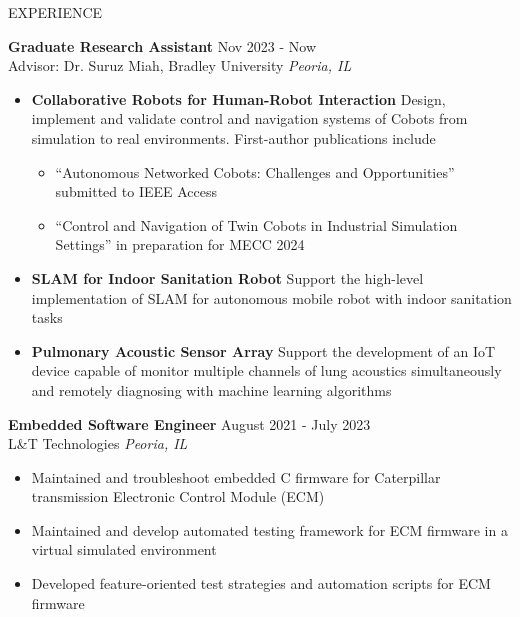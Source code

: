 \documentclass{lib/resume} %
\begin{document}
\begin{rSection}{EXPERIENCE}

    \textbf{Graduate Research Assistant} \hfill Nov 2023 - Now \\
    Advisor: Dr. Suruz Miah, Bradley University \hfill \textit{Peoria, IL}
    \begin{itemize}
        \itemsep -4pt {}
        \item \textbf{Collaborative Robots for Human-Robot Interaction} Design,
        implement and validate control and navigation systems of Cobots from
        simulation to real environments. First-author publications include
        \begin{itemize}[label=$\circ$]
            \vspace{-3pt}
            \item ``Autonomous Networked Cobots: Challenges and Opportunities'' submitted to IEEE Access
            \vspace{-3pt}
            \item ``Control and Navigation of Twin Cobots in Industrial Simulation Settings'' in preparation for MECC 2024
            \vspace{3pt}
        \end{itemize}
        \item \textbf{SLAM for Indoor Sanitation Robot} Support the high-level implementation of SLAM for autonomous mobile robot with indoor sanitation tasks
        \item \textbf{Pulmonary Acoustic Sensor Array} Support the development of an IoT device capable of monitor multiple channels of lung acoustics simultaneously and remotely diagnosing with machine learning algorithms
    \end{itemize}

    \textbf{Embedded Software Engineer} \hfill August 2021 - July 2023 \\
    L\&T Technologies \hfill \textit{Peoria, IL}
    \begin{itemize}
        \itemsep -4pt {}
        \item Maintained and troubleshoot embedded C firmware for Caterpillar transmission Electronic Control Module (ECM)
        \item Maintained and develop automated testing framework for ECM firmware in a virtual simulated environment
        \item Developed feature-oriented test strategies and automation scripts for ECM firmware
    \end{itemize}


\end{rSection}
\end{document}
